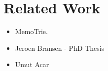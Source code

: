\chapter{Related Work}

\begin{itemize}
  \item MemoTrie.
  \item Jeroen Bransen - PhD Thesis
  \item Umut Acar
\end{itemize}